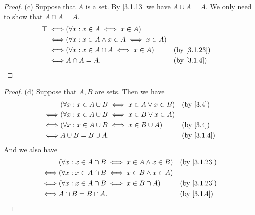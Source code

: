 \begin{proof}{(c)}
  Suppose that \(A\) is a set.
  By \cref{3.1.13} we have \(A \cup A = A\).
  We only need to show that \(A \cap A = A\).
  \begin{align*}
    \top \iff & (\forall x : x \in A \iff x \in A)                                              \\
    \iff      & (\forall x : x \in A \land x \in A \iff x \in A)                                \\
    \iff      & (\forall x : x \in A \cap A \iff x \in A)        &  & \text{(by \cref{3.1.23})} \\
    \iff      & A \cap A = A.                                    &  & \by{3.1.4}
  \end{align*}
\end{proof}

\begin{proof}{(d)}
  Suppose that \(A, B\) are sets.
  Then we have
  \begin{align*}
         & (\forall x : x \in A \cup B \iff x \in A \lor x \in B) &  & \text{(by \cref{3.4})} \\
    \iff & (\forall x : x \in A \cup B \iff x \in B \lor x \in A)                             \\
    \iff & (\forall x : x \in A \cup B \iff x \in B \cup A)       &  & \text{(by \cref{3.4})} \\
    \iff & A \cup B = B \cup A.                                   &  & \by{3.1.4}
  \end{align*}
  And we also have
  \begin{align*}
         & (\forall x : x \in A \cap B \iff x \in A \land x \in B) &  & \text{(by \cref{3.1.23})} \\
    \iff & (\forall x : x \in A \cap B \iff x \in B \land x \in A)                                \\
    \iff & (\forall x : x \in A \cap B \iff x \in B \cap A)        &  & \text{(by \cref{3.1.23})} \\
    \iff & A \cap B = B \cap A.                                    &  & \by{3.1.4}
  \end{align*}
\end{proof}

